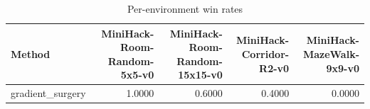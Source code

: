 \begin{table}[htbp]
\centering
\caption{Per-environment win rates}
\label{tab:per-env}
\begin{tabular}{lrrrr}
\toprule
\textbf{Method} & \textbf{MiniHack-Room-Random-5x5-v0} & \textbf{MiniHack-Room-Random-15x15-v0} & \textbf{MiniHack-Corridor-R2-v0} & \textbf{MiniHack-MazeWalk-9x9-v0} \\
\midrule
gradient\_surgery & 1.0000 & 0.6000 & 0.4000 & 0.0000 \\
\bottomrule
\end{tabular}
\end{table}